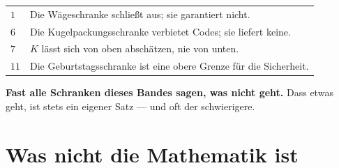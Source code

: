 \begin{merksatz}
\begin{center}
{\small
\renewcommand{\arraystretch}{1.48}
\begin{tabular}{@{}P{1.8cm}P{6.6cm}@{}}
\toprule
$1$ & Die Wägeschranke schließt aus; sie garantiert nicht.\\
$6$ & Die Kugelpackungsschranke verbietet Codes; sie liefert keine.\\
$7$ & $K$ lässt sich von oben abschätzen, nie von unten.\\
$11$ & Die Geburtstagsschranke ist eine obere Grenze für die Sicherheit.\\
\bottomrule
\end{tabular}}
\end{center}

\begin{center}
\begin{minipage}{0.9\textwidth}
\textbf{Fast alle Schranken dieses Bandes sagen, was nicht geht.} Dass etwas geht, ist stets ein eigener Satz --- und oft der schwierigere.
\end{minipage}
\end{center}

\begin{center}
\begin{minipage}{0.88\textwidth}
\end{minipage}
\end{center}
\end{merksatz}

\section{Was nicht die Mathematik ist}

